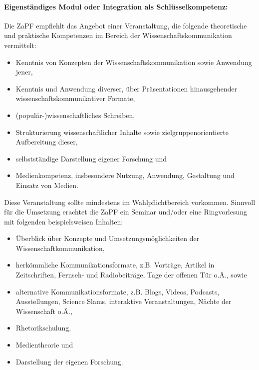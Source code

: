 \documentclass[DIV=calc]{scrartcl}
\begin{document}
\paragraph{Eigenständiges Modul oder Integration als Schlüsselkompetenz:}
Die ZaPF empfiehlt das Angebot einer Veranstaltung, die folgende theoretische und praktische Kompetenzen im Bereich der Wissenschaftskommunikation vermittelt:
\begin{itemize}

    \item Kenntnis von Konzepten der Wissenschaftskommunikation sowie Anwendung jener,

    \item Kenntnis und Anwendung diverser, über Präsentationen hinausgehender wissenschaftskommunikativer Formate,

    \item (populär-)wissenschaftliches Schreiben,

    \item Strukturierung wissenschaftlicher Inhalte sowie zielgruppenorientierte Aufbereitung dieser,

    \item selbstständige Darstellung eigener Forschung und

    \item Medienkompetenz, insbesondere Nutzung, Anwendung, Gestaltung und Einsatz von Medien.

\end{itemize}

Diese Veranstaltung sollte mindestens im Wahlpflichtbereich vorkommen. Sinnvoll für die Umsetzung erachtet die ZaPF ein Seminar und/oder eine Ringvorlesung mit folgenden beispielsweisen Inhalten:

\begin{itemize}

    \item Überblick über Konzepte und Umsetzungsmöglichkeiten der Wissenschaftkommunikation,

    \item herkömmliche Kommunikationsformate, z.B. Vorträge, Artikel in Zeitschriften, Fernseh- und Radiobeiträge, Tage der offenen Tür o.Ä., sowie

    \item alternative Kommunikationsformate, z.B. Blogs, Videos, Podcasts, Ausstellungen, Science Slams, interaktive Veranstaltungen, Nächte der Wissenschaft o.Ä.,

    \item Rhetorikschulung,

    \item Medientheorie und

    \item Darstellung der eigenen Forschung.

\end{itemize}
\end{document}

